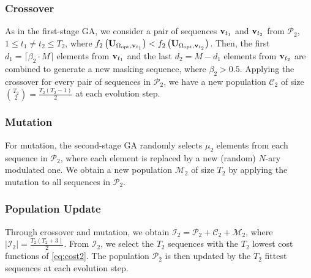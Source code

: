 \documentclass[journal]{IEEEtran}
\newcommand{\Z}{\ensuremath{\mathbb Z}}
\newcommand{\mC}{\mathcal{C}}
\newcommand{\mI}{\mathcal{I}}
\newcommand{\mM}{\mathcal{M}}
\newcommand{\mP}{\mathcal{P}}
\newcommand{\mS}{\mathcal{S}}
\newcommand{\vbu}{{\bf v}}
\newcommand{\Abu}{{\bf A}}
\newcommand{\Ubu}{{\bf U}}
\numberwithin{const2}{const}
\begin{document}
\subsubsection{Crossover}
As in the first-stage GA,
we consider a pair of sequences $\vbu_{t_1}$ and $\vbu_{t_2}$ from $\mP_2$, $1 \leq t_1 \neq t_2 \leq T_2$, where
$f_2 \left(\Ubu_{\Omega_{\rm opt}, \vbu_{t_1}} \right) < f_2 \left(\Ubu_{\Omega_{\rm opt}, \vbu_{t_2}} \right)$.
Then, the first $d_1 = \lceil \beta_2 \cdot M \rceil$ elements from $\vbu_{t_1}$
and the last $d_2 = M - d_1 $ elements from $\vbu_{t_2}$ are combined to generate a new masking sequence,
where $\beta_2 > 0.5$.
Applying the crossover for every pair of sequences in $\mP_2$,
we have a new population $\mC_2$ of size $ \binom{T_2}{2} = \frac{T_2(T_2-1)}{2}$
at each evolution step.



\subsubsection{Mutation}
For mutation, the second-stage GA %
randomly selects $\mu_2$ elements from each sequence %
in $\mP_2$,
where each element is replaced by a new (random) $N$-ary modulated one. %
We obtain
a new population $\mM_2$ of size $T_2$ by applying the mutation
to all sequences in $\mP_2$.

\subsubsection{Population Update}
Through crossover and mutation,
we obtain %
$\mI_2 = \mP_2 + \mC_2 + \mM_2$,
where $ |\mI_2| = %
\frac{T_2(T_2+3)}{2}$.
From $\mI_2$, we select the $T_2$ sequences %
with the $T_2$ lowest cost functions of \eqref{eq:cost2}.
The population $\mP_2$ is then updated by the $T_2$ fittest sequences
at each evolution step. 
\end{document}

